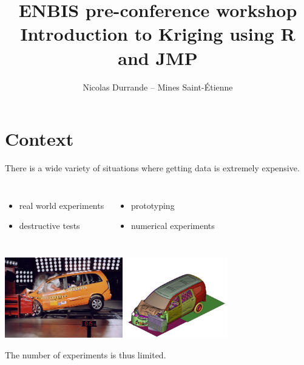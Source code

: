 \documentclass{beamer}
\title[ENBIS workshop: Introduction to Kriging 1/2]{ \small ENBIS pre-conference workshop\\ \vspace{3mm} \Large Introduction to Kriging using R and JMP }
\author[11th of Septembre 2016]{Nicolas Durrande -- Mines Saint-Étienne}
\institute{durrande@emse.fr}
\date{\null}
\begin{document}

\begin{frame}
  \titlepage
\end{frame}

\section[Context]{Context}

\begin{frame}{}
There is a wide variety of situations where getting data is extremely expensive.
\begin{columns}[c]
\column{5cm}
\begin{itemize}
	\item real world experiments
	\item destructive tests
\end{itemize}
\column{5cm}
\begin{itemize}
	\item prototyping
	\item numerical experiments
\end{itemize}
\end{columns}

\begin{center}
\includegraphics[height=3.5cm]{figures/crash-test} \qquad \includegraphics[height=3.5cm]{figures/image15}
\end{center}
The number of experiments is thus limited.
\end{frame}
\end{document}

